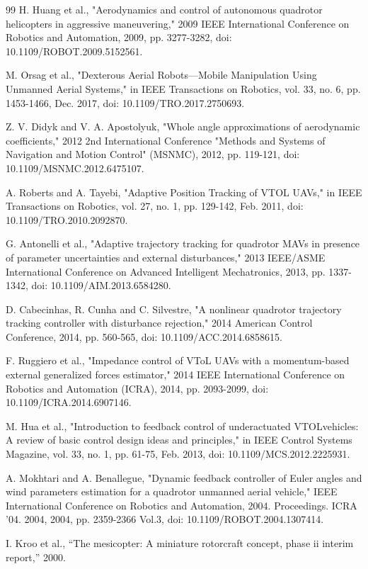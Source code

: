 \begin{thebibliography}{99}
 H. Huang et al., "Aerodynamics and control of autonomous quadrotor helicopters in aggressive maneuvering," 2009 IEEE International Conference on Robotics and Automation, 2009, pp. 3277-3282, doi: 10.1109/ROBOT.2009.5152561.

 M. Orsag et al., "Dexterous Aerial Robots—Mobile Manipulation Using Unmanned Aerial Systems," in IEEE Transactions on Robotics, vol. 33, no. 6, pp. 1453-1466, Dec. 2017, doi: 10.1109/TRO.2017.2750693.

 Z. V. Didyk and V. A. Apostolyuk, "Whole angle approximations of aerodynamic coefficients," 2012 2nd International Conference "Methods and Systems of Navigation and Motion Control" (MSNMC), 2012, pp. 119-121, doi: 10.1109/MSNMC.2012.6475107.

 A. Roberts and A. Tayebi, "Adaptive Position Tracking of VTOL UAVs," in IEEE Transactions on Robotics, vol. 27, no. 1, pp. 129-142, Feb. 2011, doi: 10.1109/TRO.2010.2092870.

 G. Antonelli et al., "Adaptive trajectory tracking for quadrotor MAVs in presence of parameter uncertainties and external disturbances," 2013 IEEE/ASME International Conference on Advanced Intelligent Mechatronics, 2013, pp. 1337-1342, doi: 10.1109/AIM.2013.6584280.

 D. Cabecinhas, R. Cunha and C. Silvestre, "A nonlinear quadrotor trajectory tracking controller with disturbance rejection," 2014 American Control Conference, 2014, pp. 560-565, doi: 10.1109/ACC.2014.6858615.

 F. Ruggiero et al., "Impedance control of VToL UAVs with a momentum-based external generalized forces estimator," 2014 IEEE International Conference on Robotics and Automation (ICRA), 2014, pp. 2093-2099, doi: 10.1109/ICRA.2014.6907146.

 M. Hua et al., "Introduction to feedback control of underactuated VTOLvehicles: A review of basic control design ideas and principles," in IEEE Control Systems Magazine, vol. 33, no. 1, pp. 61-75, Feb. 2013, doi: 10.1109/MCS.2012.2225931.

 A. Mokhtari and A. Benallegue, "Dynamic feedback controller of Euler angles and wind parameters estimation for a quadrotor unmanned aerial vehicle," IEEE International Conference on Robotics and Automation, 2004. Proceedings. ICRA '04. 2004, 2004, pp. 2359-2366 Vol.3, doi: 10.1109/ROBOT.2004.1307414.

 I. Kroo et al., “The mesicopter: A miniature rotorcraft concept, phase ii interim report,” 2000.


\end{thebibliography}
